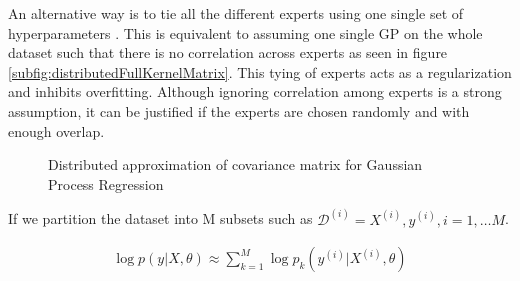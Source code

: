 An alternative way is to tie all the different experts using one single set of hyperparameters \cite{deisenroth2015distributed}. This is equivalent to assuming one single GP on the whole dataset such that there is no correlation across experts as seen in figure \ref{subfig:distributedFullKernelMatrix}. This tying of experts acts as a regularization and inhibits overfitting. Although ignoring correlation among experts is a strong assumption, it can be justified if the experts are chosen randomly and with enough overlap. 

\begin{figure}[!t]
  \centering
  \quad
  \caption{Distributed approximation of covariance matrix for Gaussian Process Regression}
\end{figure}

If we partition the dataset into M subsets such as $\mathcal{D}^{(i)} = {X^{(i)}, y^{(i)}}, i = 1, \ldots M$. 

\begin{align}\label{eq:dGPNLML}
    \log p(y| X, \theta) \approx \sum_{k=1}^{M} \log p_{k}(y^{(i)}| X^{(i)}, \theta)
 \end{align}

